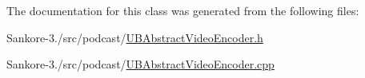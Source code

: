 The documentation for this class was generated from the following files\-:\begin{DoxyCompactItemize}
\item 
Sankore-\/3./src/podcast/\hyperlink{_u_b_abstract_video_encoder_8h}{U\-B\-Abstract\-Video\-Encoder.\-h}\item 
Sankore-\/3./src/podcast/\hyperlink{_u_b_abstract_video_encoder_8cpp}{U\-B\-Abstract\-Video\-Encoder.\-cpp}\end{DoxyCompactItemize}
